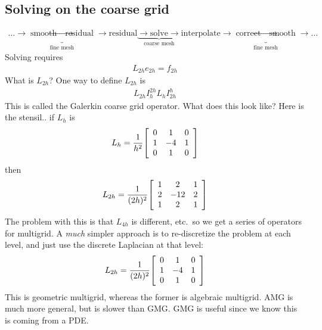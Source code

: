\documentclass{article}
\begin{document}
        \subsection{Solving on the coarse grid}
            \begin{align*}
                 \dots \rightarrow \underbrace{\text{smooth} \rightarrow \text{residual}}_\text{fine mesh} \rightarrow \text{residual} \underbrace{\rightarrow \text{solve} \rightarrow}_\text{coarse mesh} \text{interpolate} \rightarrow \underbrace{\text{correct} \rightarrow \text{smooth}}_\text{fine mesh} \rightarrow \dots
            \end{align*}
            Solving requires
            \begin{align*}
                L_{2h}e_{2h} = f_{2h}
            \end{align*}
            What is $L_{2h}$?  One way to define $L_{2h}$ is
            \begin{align*}
                L_{2h}I_h^{2h}L_hI_{2h}^h
            \end{align*}
            This is called the Galerkin coarse grid operator.  What does this look like?  Here is the stensil.. if $L_h$ is
            \begin{align*}
                L_h = \frac{1}{h^2}\qty[\begin{array}{ccc} 0 & 1 & 0 \\ 1 & -4 & 1 \\ 0 & 1 & 0\end{array}]
            \end{align*}
            then
            \begin{align*}
                L_{2h} = \frac{1}{(2h)^2}\qty[\begin{array}{ccc}1 & 2 & 1 \\ 2 & -12 & 2 \\ 1 & 2 & 1\end{array}]
            \end{align*}
            The problem with this is that $L_{4h}$ is different, etc.~so we get a series of operators for multigrid.  A \emph{much} simpler approach is to re-discretize the problem at each level, and just use the discrete Laplacian at that level:
            \begin{align*}
                L_{2h} = \frac{1}{(2h)^2}\qty[\begin{array}{ccc}0 & 1 & 0 \\ 1 & -4 & 1 \\ 0 & 1 & 0\end{array}]
            \end{align*}
            This is geometric multigrid, whereas the former is algebraic multigrid.  AMG is much more general, but is slower than GMG.  GMG is useful since we know this is coming from a PDE.
\end{document}
